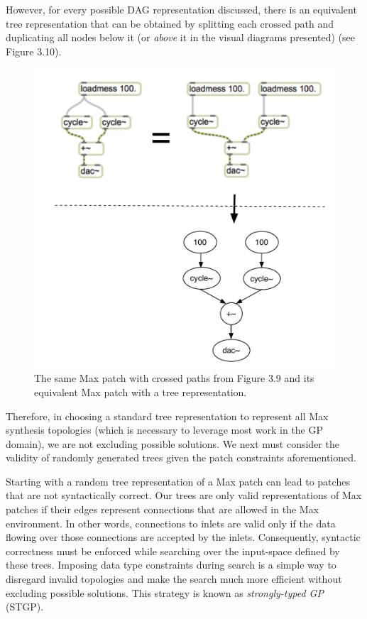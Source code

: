 \documentclass[12pt]{report} 	%
\numberwithin{figure}{chapter}
\numberwithin{table}{chapter}
\numberwithin{equation}{chapter}
\begin{document}
\begin{flushleft}
However, for every possible DAG representation discussed, there is an equivalent tree representation that can be obtained by splitting each crossed path and duplicating all nodes below it (or \textit{above} it in the visual diagrams presented) (see Figure 3.10).
\begin{figure}[h!]
\begin{center}
\includegraphics[scale=0.8]{MaxDAGsCrossedPaths2}
\caption[Uncrossing paths to form a tree]{The same Max patch with crossed paths from Figure 3.9 and its equivalent Max patch with a tree representation.}
\end{center}
\end{figure}

Therefore, in choosing a standard tree representation to represent all Max synthesis topologies (which is necessary to leverage most work in the GP domain), we are not excluding possible solutions. We next must consider the validity of randomly generated trees given the patch constraints aforementioned.

Starting with a random tree representation of a Max patch can lead to patches that are not syntactically correct. Our trees are only valid representations of Max patches if their edges represent connections that are allowed in the Max environment. In other words, connections to inlets are valid only if the data flowing over those connections are accepted by the inlets. Consequently, syntactic correctness must be enforced while searching over the input-space defined by these trees. Imposing data type constraints during search is a simple way to disregard invalid topologies and make the search much more efficient without excluding possible solutions. This strategy is known as \textit{strongly-typed GP} (STGP). 


\end{flushleft}
\end{document}
